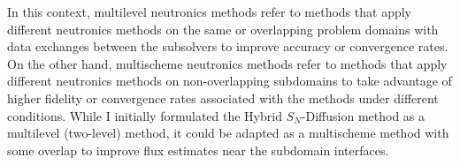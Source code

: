 In this context, multilevel neutronics methods refer to methods that apply different neutronics
methods on the same or overlapping problem domains with data exchanges between the subsolvers to
improve accuracy or convergence rates. On the other hand, multischeme neutronics methods refer to
methods that apply different neutronics methods on non-overlapping subdomains to take advantage of
higher fidelity or convergence rates associated with the methods under different conditions. While
I initially formulated the Hybrid $S_N$-Diffusion method as a multilevel (two-level) method, it
could be adapted as a multischeme method with some overlap to improve flux estimates near the
subdomain interfaces.
